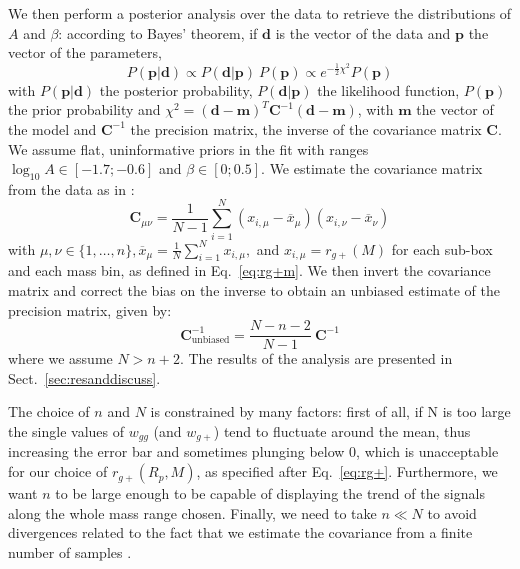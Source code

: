 \documentclass[a4paper,fleqn,usenatbib]{mnras}
\begin{document}
We then perform a posterior analysis over the data to retrieve the distributions of $A$ and $\beta$: according to Bayes' theorem, if $\boldsymbol{d}$ is the vector of the data and $\boldsymbol{p}$ the vector of the parameters, 
\begin{equation}
    P(\boldsymbol{p} | \boldsymbol{d}) \propto P(\boldsymbol{d} | \boldsymbol{p}) \ P(\boldsymbol{p}) \propto e^{-\frac{1}{2} \chi ^2} P(\boldsymbol{p})
	\label{eq:bayes}
\end{equation}
with  $P(\boldsymbol{p} | \boldsymbol{d})$ the posterior probability,  $P(\boldsymbol{d} | \boldsymbol{p})$ the likelihood function, $P(\boldsymbol{p})$ the prior probability and $\chi ^2 = (\boldsymbol{d} - \boldsymbol{m})^T \mathbf{C}^{-1} (\boldsymbol{d} - \boldsymbol{m})$, with $\boldsymbol{m}$ the vector of the model and $\mathbf{C}^{-1}$ the precision matrix, the inverse of the covariance matrix $\mathbf{C}$. We assume flat, uninformative priors in the fit with ranges $\log_{10} A \in [-1.7;-0.6]$  and $\beta \in [0;0.5]$. We estimate the covariance matrix from the data as in \citet{Tayloretal2013}:
\begin{equation}
     \mathbf{C}_{\mu \nu} = \frac{1}{N-1} \sum_{i = 1}^{N} (x_{i, \mu} - \overline{x}_{\mu})(x_{i, \nu} - \overline{x}_{\nu})
	\label{eq:covariance}
\end{equation}
with $\mu, \nu \in \{1, \dotso, n\},  \overline{x}_{\mu} = \frac{1}{N} \sum_{i=1}^{N} x_{i, \mu},$ and $x_{i, \mu}= r_{g+}(M)$ for each sub-box and each mass bin, as defined in Eq.~\ref{eq:rg+m}. We then invert the covariance matrix and correct the bias on the inverse to obtain an unbiased estimate of the precision matrix, given by:
\begin{equation}
     \mathbf{C}^{-1}_{\mbox{unbiased}} = \frac{N - n -2}{N-1} \  \mathbf{C}^{-1}
	\label{eq:precunbiased}
\end{equation}
where we assume $N > n+2$. The results of the analysis are presented in Sect.~\ref{sec:resanddiscuss}.

The choice of $n$ and $N$ is constrained by many factors: first of all, if N is too large the single values of $w_{gg}$ (and $w_{g+}$) tend to fluctuate around the mean, thus increasing the error bar and sometimes plunging below 0, which is unacceptable for our choice of $ r_{g+} (R_p, M)$, as specified after Eq.~\ref{eq:rg+}. Furthermore, we want $n$ to be large enough to be capable of displaying the trend of the signals along the whole mass range chosen. Finally, we need to take $n \ll N$ to avoid divergences related to the fact that we estimate the covariance from a finite number of samples \citep{Tayloretal2013}.
\end{document}
